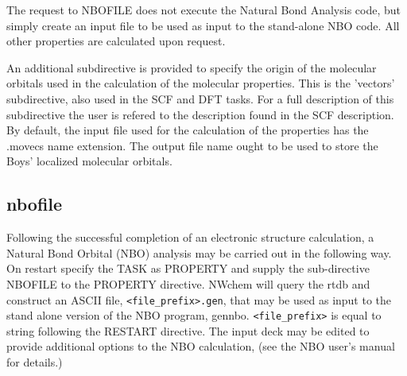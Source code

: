 The request to NBOFILE does not execute the Natural Bond Analysis
code, but simply create an input file to be used as input to the
stand-alone NBO code. All other properties are calculated upon
request.

An additional subdirective is provided to specify the origin of the
molecular orbitals used in the calculation of the molecular
properties. This is the 'vectors' subdirective, also used in the
SCF and DFT tasks. For a full description of this subdirective
the user is refered to the description found in the SCF description.
By default, the input file used for the calculation of the properties
has the .movecs name extension. The output file name ought to be
used to store the Boys' localized molecular orbitals.

\subsection{nbofile}

Following the successful completion of an electronic structure
calculation, a Natural Bond Orbital (NBO) analysis may be carried out
in the following way.  On restart specify the TASK as PROPERTY and
supply the sub-directive NBOFILE to the PROPERTY directive.  NWchem
will query the rtdb and construct an ASCII file,
\verb+<file_prefix>.gen+, that may be used as input to the stand alone
version of the NBO program, gennbo.  \verb+<file_prefix>+ is equal to
string following the RESTART directive.  The input deck may be edited
to provide additional options to the NBO calculation, (see the NBO
user's manual for details.)

